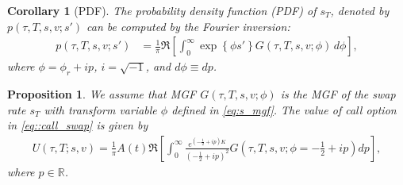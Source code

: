 \documentclass[pdftex,11pt,a4paper] {article}
\newtheorem{corollary}{Corollary}[section]
\newtheorem{proposition}{Proposition}[section]
\begin{document}
\begin{corollary}[PDF] The probability density function (PDF) of $s_{T}$, denoted by $p(\tau,T,s, v;s')$ can be computed by the Fourier inversion:
\begin{equation}\label{eq:fourier_inv1}
\begin{split}
p(\tau,T,s, v;s') & = \frac{1}{\pi}\Re\left[ \int^{\infty}_{0}\exp \left\{ \phi s' \right\} G(\tau,T,s, v; \phi)\,d\phi\right],
\end{split} 
\end{equation}
where $\phi=\phi_{r}+ip$,  $i=\sqrt{-1}$, and $d\phi \equiv dp$.

\end{corollary} 




\begin{proposition}\label{prop:capped_pay_swap} We assume that MGF $G(\tau, T, s, v; \phi)$ is the MGF of the swap rate $s_T$ with transform variable $\phi$ defined in \eqref{eq:s_mgf}. The value of call option in \eqref{eq::call_swap} is given by
\begin{equation} \label{eq:capped_pay}
\begin{split}
  U(\tau, T; s, v) = \frac{1}{\pi} A(t)\Re\left[\int^{\infty}_{0}\frac{e^{\left(-\frac{1}{2}+ip\right) K}}{\left(-\frac{1}{2}+ip\right)^2}G(\tau,T, s, v;\phi=-\frac{1}{2}+ip)dp\right],
\end{split} 
\end{equation}
where $p\in\mathbb{R}$.  
\end{proposition}
\end{document}
